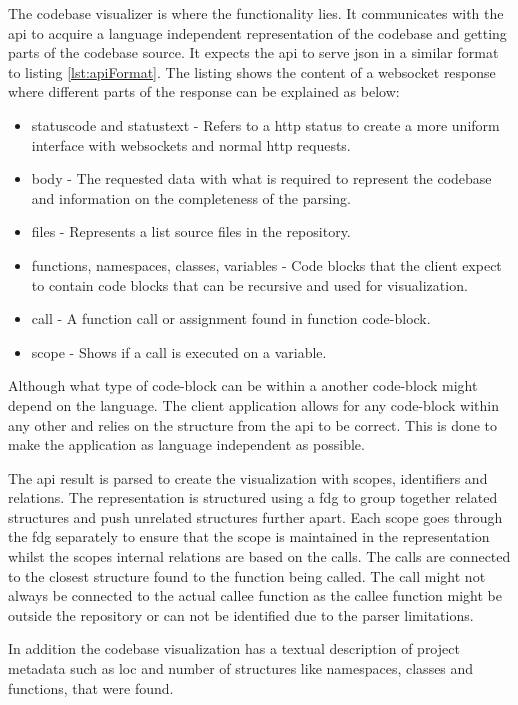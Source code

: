 The codebase visualizer is where the functionality lies. It communicates with the \gls{api} to acquire a language independent representation of the codebase and getting parts of the codebase source. It expects the \gls{api} to serve \gls{json} in a similar format to listing \ref{lst:apiFormat}. The listing shows the content of a \gls{websocket} response where different parts of the response can be explained as below:
\begin{itemize}
    \item statuscode and statustext - Refers to a \gls{http} status to create a more uniform interface with \glspl{websocket} and normal \gls{http} requests.
    \item body - The requested data with what is required to represent the codebase and information on the completeness of the parsing.
    \item files - Represents a list source files in the repository.
    \item functions, namespaces, classes, variables - Code blocks that the \gls{client} expect to contain code blocks that can be \gls{recursive} and used for visualization.
    \item call - A function call or assignment found in function code-block.
    \item scope - Shows if a call is executed on a variable.
\end{itemize}

Although what type of code-block can be within a another code-block might depend on the language. The \gls{client} application allows for any code-block within any other and relies on the structure from the \gls{api} to be correct. This is done to make the application as language independent as possible.

The \gls{api} result is parsed to create the visualization with scopes, identifiers and relations. The representation is structured using a \gls{fdg} to group together related structures and push unrelated structures further apart. Each scope goes through the \gls{fdg} separately to ensure that the scope is maintained in the representation whilst the scopes internal relations are based on the calls. The calls are connected to the closest structure found to the function being called. The call might not always be connected to the actual callee function as the callee function might be outside the repository or can not be identified due to the parser limitations. 

In addition the codebase visualization has a textual description of project metadata such as \gls{loc} and number of structures like \glspl{namespace}, classes and functions, that were found.

